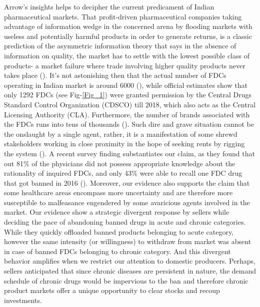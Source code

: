 \documentclass[AER]{AEA}
\theoremstyle{theorem}
\begin{document}
Arrow's insights helps to decipher the current predicament of Indian pharmaceutical markets. That profit-driven pharmaceutical companies  taking advantage of information wedge in the concerned arena by flooding markets with useless and potentially harmful products in order to generate returns, is a classic prediction of  the asymmetric information theory that says in the absence of information on quality, the market has to settle with the lowest possible class of products- a market failure where trade involving higher quality products never takes place (\cite{akerlof1970market}). It's not astonishing then that the actual number of FDCs operating in Indian market is around 6000 (\cite{gupta2016fixed}), while official estimates show that only 1292 FDCs (see Fig-\ref{Fig_1}) were granted permission by the Central Drugs Standard Control Organization (CDSCO) till 2018, which also acts as the Central Licensing Authority (CLA). Furthermore, the number of brands associated with the FDCs runs into tens of thousands (\cite{gupta2016fixed}). Such dire and grave situation cannot be the onslaught by a single agent, rather, it is a manifestation of some shrewd stakeholders working in close proximity in the hope of seeking rents by rigging the system (\cite{bhaskarabhatla2017role}). A recent survey finding substantiates our claim, as they found that out 81\% of the physicians did not possess appropriate knowledge about the rationality of inquired FDCs, and only 43\% were able to recall one FDC drug that got banned in 2016 (\cite{roy2007drug}).
Moreover, our evidence also supports the claim that some healthcare areas encompass more uncertainty and are therefore more susceptible to malfeasance engendered by some avaricious agents involved in the market. Our evidence show a strategic divergent response by sellers while deciding the pace of abandoning banned drugs in acute and chronic categories. While they quickly offloaded banned products belonging to acute category, however the same intensity (or willingness) to withdraw from market was absent in case of banned FDCs belonging to chronic category. And this divergent behavior amplifies when we restrict our attention to domestic producers. Perhaps, sellers anticipated that since chronic diseases are persistent in nature, the demand schedule of chronic drugs would be impervious to the ban and therefore chronic product markets offer a unique opportunity to clear stocks and recoup investments.

\end{document}
